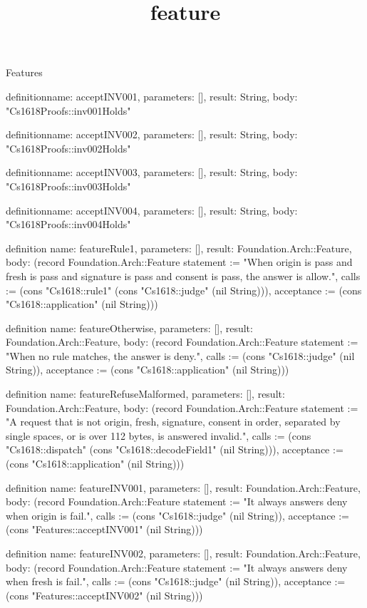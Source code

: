 \begin{lexlean}{Features}
\title{feature}
\begin{semanticmodule}
definition{name: acceptINV001, parameters: [], result: String, body: "Cs1618Proofs::inv001Holds"}

definition{name: acceptINV002, parameters: [], result: String, body: "Cs1618Proofs::inv002Holds"}

definition{name: acceptINV003, parameters: [], result: String, body: "Cs1618Proofs::inv003Holds"}

definition{name: acceptINV004, parameters: [], result: String, body: "Cs1618Proofs::inv004Holds"}

definition{
  name: featureRule1,
  parameters: [],
  result: Foundation.Arch::Feature,
  body: (record Foundation.Arch::Feature {statement := "When origin is pass and fresh is pass and signature is pass and consent is pass, the answer is allow.", calls := (cons "Cs1618::rule1" (cons "Cs1618::judge" (nil String))), acceptance := (cons "Cs1618::application" (nil String))})
}

definition{
  name: featureOtherwise,
  parameters: [],
  result: Foundation.Arch::Feature,
  body: (record Foundation.Arch::Feature {statement := "When no rule matches, the answer is deny.", calls := (cons "Cs1618::judge" (nil String)), acceptance := (cons "Cs1618::application" (nil String))})
}

definition{
  name: featureRefuseMalformed,
  parameters: [],
  result: Foundation.Arch::Feature,
  body: (record Foundation.Arch::Feature {statement := "A request that is not origin, fresh, signature, consent in order, separated by single spaces, or is over 112 bytes, is answered invalid.", calls := (cons "Cs1618::dispatch" (cons "Cs1618::decodeField1" (nil String))), acceptance := (cons "Cs1618::application" (nil String))})
}

definition{
  name: featureINV001,
  parameters: [],
  result: Foundation.Arch::Feature,
  body: (record Foundation.Arch::Feature {statement := "It always answers deny when origin is fail.", calls := (cons "Cs1618::judge" (nil String)), acceptance := (cons "Features::acceptINV001" (nil String))})
}

definition{
  name: featureINV002,
  parameters: [],
  result: Foundation.Arch::Feature,
  body: (record Foundation.Arch::Feature {statement := "It always answers deny when fresh is fail.", calls := (cons "Cs1618::judge" (nil String)), acceptance := (cons "Features::acceptINV002" (nil String))})
}


\end{semanticmodule}
\end{lexlean}
